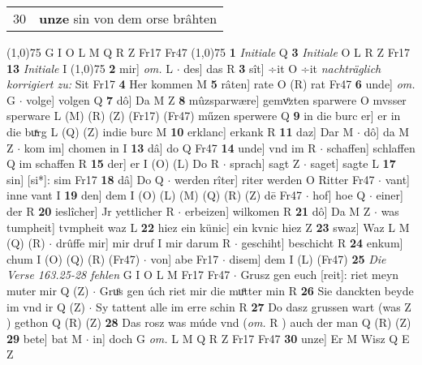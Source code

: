 \documentclass[8pt,a4paper,notitlepage]{article}
\begin{document}
\begin{table}[ht]
\begin{minipage}[t]{0.5\linewidth}
\begin{tabular}{rl}
30 & \textbf{unze} sin von dem orse brâhten\\ 
\end{tabular}
\scriptsize
\line(1,0){75} \newline
G I O L M Q R Z Fr17 Fr47 \newline
\line(1,0){75} \newline
\textbf{1} \textit{Initiale} Q  \textbf{3} \textit{Initiale} O L R Z Fr17  \textbf{13} \textit{Initiale} I  \newline
\line(1,0){75} \newline
\textbf{2} mir] \textit{om.} L  $\cdot$ des] das R \textbf{3} sît] ÷it O ÷it \textit{nachträglich korrigiert zu:} Sit Fr17 \textbf{4} Her kommen M \textbf{5} râten] rate O (R) rat Fr47 \textbf{6} unde] \textit{om.} G  $\cdot$ volge] volgen Q \textbf{7} dô] Da M Z \textbf{8} mûzsparwære] gemvͦzten sparwere O mvsser sperware L (M) (R) (Z) (Fr17) (Fr47) műzen sperwere Q \textbf{9} in die burc er] er in die buͯrg L (Q) (Z) indie burc M \textbf{10} erklanc] erkank R \textbf{11} daz] Dar M  $\cdot$ dô] da M Z  $\cdot$ kom im] chomen in I \textbf{13} dâ] do Q Fr47 \textbf{14} unde] vnd im R  $\cdot$ schaffen] schlaffen Q im schaffen R \textbf{15} der] er I (O) (L) Do R  $\cdot$ sprach] sagt Z  $\cdot$ saget] sagte L \textbf{17} sin] [si*]: sim Fr17 \textbf{18} dâ] Do Q  $\cdot$ werden rîter] riter werden O Ritter Fr47  $\cdot$ vant] inne vant I \textbf{19} den] dem I (O) (L) (M) (Q) (R) (Z) dē Fr47  $\cdot$ hof] hoe Q  $\cdot$ einer] der R \textbf{20} ieslîcher] Jr yettlicher R  $\cdot$ erbeizen] wilkomen R \textbf{21} dô] Da M Z  $\cdot$ was tumpheit] tvmpheit waz L \textbf{22} hiez ein künic] ein kvnic hiez Z \textbf{23} swaz] Waz L M (Q) (R)  $\cdot$ drûffe mir] mir druf I mir darum R  $\cdot$ geschiht] beschicht R \textbf{24} enkum] chum I (O) (Q) (R) (Fr47)  $\cdot$ von] abe Fr17  $\cdot$ disem] dem I (L) (Fr47) \textbf{25} \textit{Die Verse 163.25-28 fehlen} G I O L M Fr17 Fr47   $\cdot$ Grusz gen euch [reit]: riet meyn muter mir Q (Z)  $\cdot$ Gruͦs gen úch riet mir die muͦtter min R \textbf{26} Sie danckten beyde im vnd ir Q (Z)  $\cdot$ Sy tattent alle im erre schin R \textbf{27} Do dasz grussen wart (was Z ) gethon Q (R) (Z) \textbf{28} Das rosz was múde vnd (\textit{om.} R ) auch der man Q (R) (Z) \textbf{29} bete] bat M  $\cdot$ in] doch G \textit{om.} L M Q R Z Fr17 Fr47 \textbf{30} unze] Er M Wisz Q E Z \newline
\end{minipage}
\hspace{0.5cm}
\begin{minipage}[t]{0.5\linewidth}

\end{minipage}
\end{table}
\end{document}
